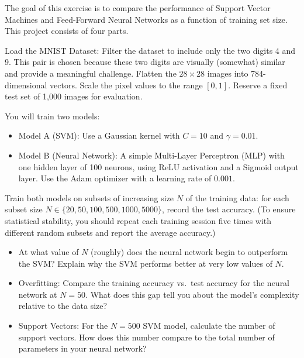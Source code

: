 \begin{myexercise}
The goal of this exercise is to compare the performance of Support Vector Machines  and Feed-Forward Neural Networks as a function of training set size. This project consists of four parts.

\smallskip
\noindent
Load the MNIST Dataset: Filter the dataset to include only the two digits 4 and 9.
This pair is chosen because these two digits are visually (somewhat) similar and provide a meaningful challenge.
Flatten the $28 \times 28$ images into 784-dimensional vectors. Scale the pixel values to the range $[0, 1]$. Reserve a fixed test set of 1,000 images for evaluation.

You will train two models:
\begin{itemize}
\item Model A (SVM): Use a Gaussian kernel with $C=10$ and $\gamma=0.01$.
\item Model B (Neural Network): A simple Multi-Layer Perceptron (MLP) with one hidden layer of 100 neurons, using ReLU activation and a Sigmoid output layer. Use the Adam optimizer with a learning rate of $0.001$.
\end{itemize}

Train both models on subsets of increasing size $N$ of the training data: for each subset size $N \in \{20, 50, 100, 500, 1000, 5000\}$, record the test accuracy.
(To ensure statistical stability, you should repeat each training session five times with different random subsets and report the average accuracy.)


\begin{itemize}
\item[(a)] At what value of $N$ (roughly) does the neural network begin to outperform the SVM? Explain why the SVM performs better at very low values of $N$.
\item[(b)] 
Overfitting: Compare the training accuracy vs.\ test accuracy for the neural network at $N=50$. What does this gap tell you about the model's complexity relative to the data size?
\item[(c)] 
Support Vectors: For the $N=500$ SVM model, calculate the number of support vectors. How does this number compare to the total number of parameters in your neural network?
\end{itemize}

\end{myexercise}

